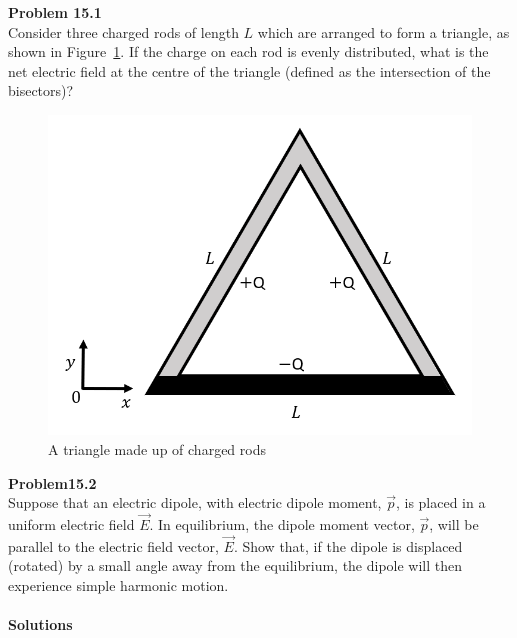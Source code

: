 \begin{framed}
\textbf{Problem 15.1}\\
Consider three charged rods of length $L$ which are arranged to form a triangle, as shown in Figure~\ref{fig:ChargesFields:trianglediagram}. If the charge on each rod is evenly distributed, what is the net electric field at the centre of the triangle (defined as the intersection of the bisectors)?

\begin{figure}[!htbp]
\centering
\includegraphics[width=0.4\linewidth]{files/trianglediagram-57cfb5fcb5af53ea4a1cdbd640dc0dee.png}
\caption[]{A triangle made up of charged rods}
\label{fig:ChargesFields:trianglediagram}
\end{figure}
\end{framed}

\begin{framed}
\textbf{Problem15.2}\\
Suppose that an electric dipole, with electric dipole moment, $\vec p$, is placed in a uniform electric field $\vec E$. In equilibrium, the dipole moment vector, $\vec p$, will be parallel to the electric field vector, $\vec E$. Show that, if the dipole is displaced (rotated) by a small angle away from the equilibrium, the dipole will then experience simple harmonic motion.
\end{framed}

\paragraph{Solutions}

